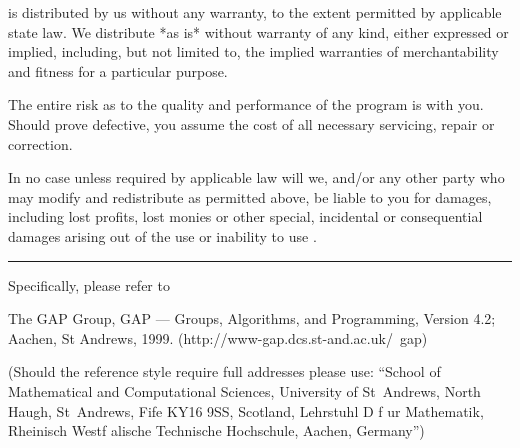 {\GAP} is distributed by us without any warranty, to the extent permitted
by applicable state law.  We  distribute {\GAP} *as is* without  warranty
of any kind, either expressed or implied, including,  but not limited to,
the implied  warranties  of merchantability and  fitness for a particular
purpose.

The entire risk as to the quality and performance of the program is  with
you.  Should {\GAP} prove defective, you assume the cost of all necessary
servicing, repair or correction.

In no  case  unless  required by applicable law will we, and/or any other
party who  may  modify  and  redistribute  {\GAP}  as permitted above, be
liable  to you for damages, including lost profits, lost monies or  other
special, incidental or consequential damages  arising out  of the  use or
inability to use {\GAP}.

\hrule

Specifically, please refer to

\begintt
[GAP 00] The GAP Group, GAP --- Groups, Algorithms, and Programming,
	 Version 4.2; Aachen, St Andrews, 1999.
         (http://www-gap.dcs.st-and.ac.uk/~gap)
\endtt

(Should the reference style require full addresses please use:
``School of Mathematical and Computational Sciences,
University of St~Andrews,
North Haugh, St~Andrews, Fife KY16 9SS, Scotland,
Lehrstuhl D f{ u}r Mathematik,
Rheinisch Westf{ a}lische Technische Hochschule, Aachen,
Germany'')

